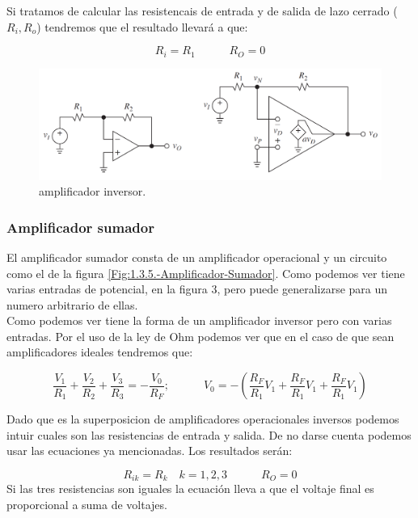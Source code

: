 \documentclass[11pt]{article} %
\newcommand{\parentesis}[1]{\left( #1  \right)}
\newcommand{\tquad}{\quad \quad \quad}
\begin{document}
Si tratamos de calcular las resistencais de entrada y de salida de lazo cerrado ($R_i, R_o$) tendremos que el resultado llevará a que:

\begin{equation}
R_i = R_1 \tquad R_O = 0
\end{equation}




\begin{figure}[t] \centering
\includegraphics[scale=0.4]{1.4-Amplificador-inversor.png}
\caption{amplificador inversor.}
\label{Fig:1.4-Amplificador-Inversor}
\end{figure} 


\subsubsection{Amplificador sumador}

El amplificador sumador consta de un amplificador operacional y un circuito como el de la figura \ref{Fig:1.3.5.-Amplificador-Sumador}. Como podemos ver tiene varias entradas de potencial, en la figura 3, pero puede generalizarse para un numero arbitrario de ellas.\\

Como podemos ver tiene la forma de un amplificador inversor pero con varias entradas. Por el uso de la ley de Ohm podemos ver que en el caso de que sean amplificadores ideales tendremos que:

\begin{equation}
\dfrac{V_1}{R_1}+\dfrac{V_2}{R_2}+\dfrac{V_3}{R_3}=-\dfrac{V_0}{R_F}; \tquad V_0 = - \parentesis{\dfrac{R_F}{R_1}V_1+\dfrac{R_F}{R_1}V_1+\dfrac{R_F}{R_1}V_1}
\end{equation}

Dado que es la superposicion de amplificadores operacionales inversos podemos intuir cuales son las resistencias de entrada y salida. De no darse cuenta podemos usar las ecuaciones ya mencionadas. Los resultados serán:

\begin{equation}
R_{ik} = R_k \quad k =1,2,3 \tquad R_O=0
\end{equation}
Si las tres resistencias son iguales la ecuación lleva a que el voltaje final es proporcional a suma de voltajes.
\end{document}

